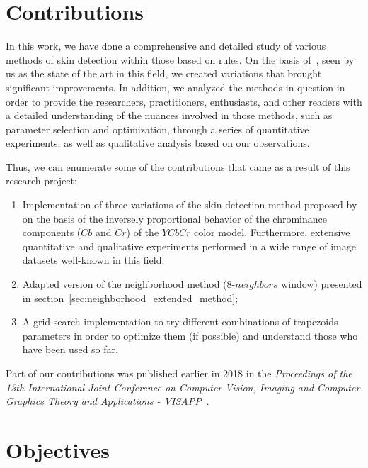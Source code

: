 \section{Contributions}
\label{sec:contributions}

In this work, we have done a comprehensive and detailed study of various methods of skin detection within those based on rules. On the basis of~\citet{brancati:17}, seen by us as the state of the art in this field, we created variations that brought significant improvements. In addition, we analyzed the methods in question in order to provide the researchers, practitioners, enthusiasts, and other readers with a detailed understanding of the nuances involved in those methods, such as parameter selection and optimization, through a series of quantitative experiments, as well as qualitative analysis based on our observations.

Thus, we can enumerate some of the contributions that came as a result of this research project:
\begin{enumerate}
    \item Implementation of three variations of the skin detection method proposed by~\citet{brancati:17} on the basis of the inversely proportional behavior of the chrominance components ($Cb$ and $Cr$) of the $YCbCr$ color model. Furthermore, extensive quantitative and qualitative experiments performed in a wide range of image datasets well-known in this field;
    \item Adapted version of the neighborhood method (8-$neighbors$ window) presented in section~\ref{sec:neighborhood_extended_method};
    \item A grid search implementation to try different combinations of trapezoids parameters in order to optimize them (if possible) and understand those who have been used so far.
\end{enumerate}

Part of our contributions was published earlier in 2018 in the \emph{Proceedings of the 13th International Joint Conference on Computer Vision, Imaging and Computer Graphics Theory and Applications - VISAPP}~\citep{faria:18}.


\section{Objectives}
\label{sec:objectives}

